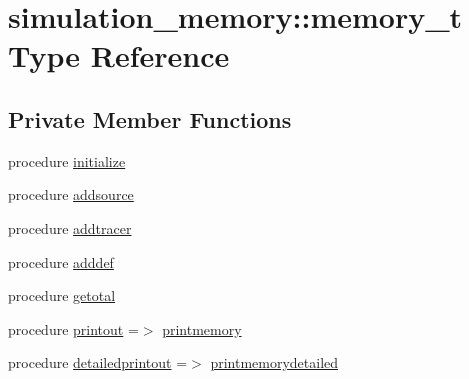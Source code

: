 \hypertarget{structsimulation__memory_1_1memory__t}{}\section{simulation\+\_\+memory\+:\+:memory\+\_\+t Type Reference}
\label{structsimulation__memory_1_1memory__t}
\subsection*{Private Member Functions}
\begin{DoxyCompactItemize}
\item 
procedure \mbox{\hyperlink{structsimulation__memory_1_1memory__t_a39beb04a9ab65e562b834d9db3b4e214}{initialize}}
\item 
procedure \mbox{\hyperlink{structsimulation__memory_1_1memory__t_a55a678b567d22acf18437743f3afdfdf}{addsource}}
\item 
procedure \mbox{\hyperlink{structsimulation__memory_1_1memory__t_a52610485fd6c793751a506db0ecb3f27}{addtracer}}
\item 
procedure \mbox{\hyperlink{structsimulation__memory_1_1memory__t_a5a231dfd0c9f39ad6c949519ad168f70}{adddef}}
\item 
procedure \mbox{\hyperlink{structsimulation__memory_1_1memory__t_a1677c1871975872cba406a8729fbedb5}{getotal}}
\item 
procedure \mbox{\hyperlink{structsimulation__memory_1_1memory__t_a1972d13f7be392f9ebd5d27e90dfc4e5}{printout}} =$>$ \mbox{\hyperlink{namespacesimulation__memory_a5827bef8479b809a453af147ceaa8c7c}{printmemory}}
\item 
procedure \mbox{\hyperlink{structsimulation__memory_1_1memory__t_a742a2dddb7feb68044886b534cdc871d}{detailedprintout}} =$>$ \mbox{\hyperlink{namespacesimulation__memory_af2a472000acc1ff59cb6e63679617699}{printmemorydetailed}}
\end{DoxyCompactItemize}
